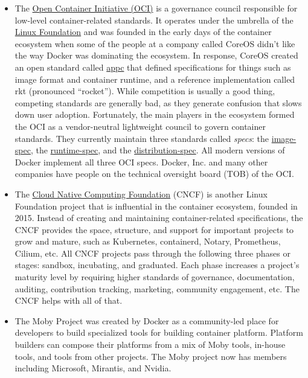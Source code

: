 \documentclass[table, xcdraw]{article}%
\begin{document}
\begin{itemize}
    \item The \href{https://opencontainers.org/}{Open Container Initiative (OCI)} is a governance council responsible for low-level container-related standards. It operates under the umbrella of the \href{https://www.linuxfoundation.org/projects}{Linux Foundation} and was founded in the early days of the container ecosystem when some of the people at a company called CoreOS didn’t like the way Docker was dominating the ecosystem. In response, CoreOS created an open standard called \href{https://github.com/appc/spec/}{appc} that defined specifications for things such as image format and container runtime, and a reference implementation called rkt (pronounced “rocket”). While competition is usually a good thing, competing standards are generally bad, as they generate confusion that slows down user adoption. Fortunately, the main players in the ecosystem formed the OCI as a vendor-neutral lightweight council to govern container standards. They currently maintain three standards called \emph{specs}: the \href{https://github.com/opencontainers/image-spec}{image-spec}, the \href{https://github.com/opencontainers/runtime-spec}{runtime-spec}, and the \href{https://github.com/opencontainers/distribution-spec}{distribution-spec}. All modern versions of Docker implement all three OCI specs. Docker, Inc. and many other companies have people on the technical oversight board (TOB) of the OCI.
    \item The \href{https://www.cncf.io/}{Cloud Native Computing Foundation} (CNCF) is another Linux Foundation project that is influential in the container ecosystem, founded in 2015. Instead of creating and maintaining container-related specifications, the CNCF provides the space, structure, and support for important projects to grow and mature, such as Kubernetes, containerd, Notary, Prometheus, Cilium, etc. All CNCF projects pass through the following three phases or stages: sandbox, incubating, and graduated. Each phase increases a project’s maturity level by requiring higher standards of governance, documentation, auditing, contribution tracking, marketing, community engagement, etc. The CNCF helps with all of that.
    \item The Moby Project was created by Docker as a community-led place for developers to build specialized tools for building container platform. Platform builders can compose their platforms from a mix of Moby tools, in-house tools, and tools from other projects. The Moby project now has members including Microsoft, Mirantis, and Nvidia.
\end{itemize}
\end{document}
